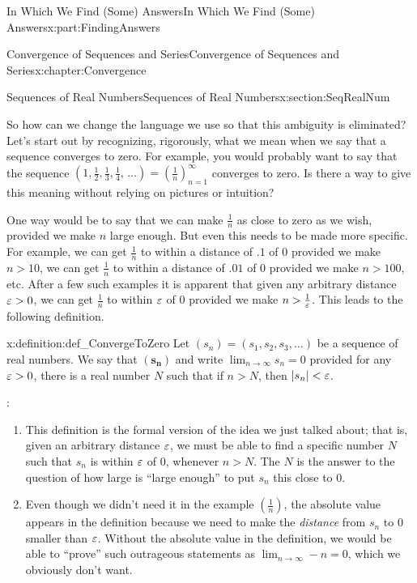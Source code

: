 \begin{partptx}{In Which We Find (Some) Answers}{}{In Which We Find (Some) Answers}{}{}{x:part:FindingAnswers}
\begin{chapterptx}{Convergence of Sequences and Series}{}{Convergence of Sequences and Series}{}{}{x:chapter:Convergence}
\begin{sectionptx}{Sequences of Real Numbers}{}{Sequences of Real Numbers}{}{}{x:section:SeqRealNum}
			\par
			So how can we change the language we use so that this ambiguity is eliminated? Let's start out by recognizing, rigorously, what we mean when we say that a sequence converges to zero. For example, you would probably want to say that the sequence \(\left(1,\frac{1}{2},\frac{1}{3},\frac{1}{4},\,\ldots\right)=\left( \frac{1}{n}\right)_{n=1}^\infty\) converges to zero. Is there a way to give this meaning without relying on pictures or intuition?%
			\par
			One way would be to say that we can make \(\frac{1}{n}\) as close to zero as we wish, provided we make \(n\) large enough. But even this needs to be made more specific. For example, we can get \(\frac{1}{n}\) to within a distance of \(.1\) of \(0\) provided we make \(n>10\), we can get \(\frac{1}{n}\) to within a distance of \(.01\) of \(0\) provided we make \(n>100\), etc. After a few such examples it is apparent that given any arbitrary distance \(\varepsilon>0\), we can get \(\frac{1}{n}\) to within \(\varepsilon\) of \(0\) provided we make \(n>\frac{1}{\varepsilon}\). This leads to the following definition.%
			\begin{definition}{}{x:definition:def_ConvergeToZero}%
				 Let \(\left(s_n\right)=\left(s_1,s_2,s_3,\ldots\right)\) be a sequence of real numbers. We say that \(\left(\boldsymbol{s}_{\boldsymbol{n}}\right)\)  and write \(\lim_{n\rightarrow\infty}s_n=0\) provided for any \(\varepsilon>0\), there is a real number \(N\) such that if \(n>N\), then \(|s_n|< \varepsilon\).%
			\end{definition}
			:%
			\begin{enumerate}
				\item{}This definition is the formal version of the idea we just talked about; that is, given an arbitrary distance \(\varepsilon\), we must be able to find a specific number \(N\) such that \(s_n\) is within \(\varepsilon\) of \(0\), whenever \(n>N\). The \(N\) is the answer to the question of how large is ``large enough'' to put \(s_n\) this close to \(0\).%
				\item{}Even though we didn't need it in the example \(\left(\frac{1}{n}\right)\), the absolute value appears in the definition because we need to make the \emph{distance} from \(s_n\) to 0 smaller than \(\varepsilon\). Without the absolute value in the definition, we would be able to ``prove'' such outrageous statements as \(\lim_{n\rightarrow\infty}-n=0\), which we obviously don't want.%

\end{enumerate}
\end{sectionptx}
\end{chapterptx}
\end{partptx}
